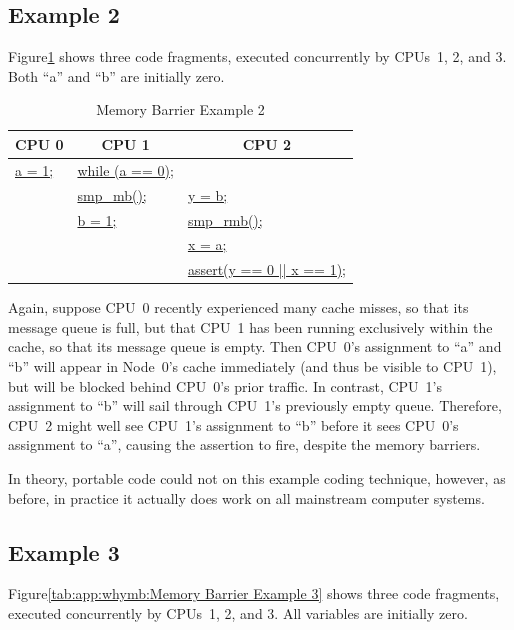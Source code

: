 \subsection{Example 2}
\label{sec:app:whymb:Example 2}

Figure\ref{tab:app:whymb:Memory Barrier Example 2}
shows three code fragments, executed concurrently by CPUs~1, 2, and 3.
Both ``a'' and ``b'' are initially zero.

\begin{table}
\small
\begin{center}
\begin{tabular}{l|l|l}
	\multicolumn{1}{c|}{CPU 0} &
		\multicolumn{1}{c|}{CPU 1} &
			\multicolumn{1}{c}{CPU 2} \\
	\hline
	\hline
	\url{a = 1;} & \url{while (a == 0)}; & \\
		     & \url{smp_mb();}	& \url{y = b;} \\
		     & \url{b = 1;}	& \url{smp_rmb();} \\
		     &			& \url{x = a;} \\
		     &			& \url{assert(y == 0 || x == 1);} \\
\end{tabular}
\end{center}
\caption{Memory Barrier Example 2}
\label{tab:app:whymb:Memory Barrier Example 2}
\end{table}

Again, suppose CPU~0 recently experienced many cache misses, so that its
message queue is full, but that CPU~1 has been running exclusively within
the cache, so that its message queue is empty.
Then CPU~0's assignment to ``a'' and ``b'' will appear in Node~0's cache
immediately (and thus be visible to CPU~1), but will be blocked behind
CPU~0's prior traffic.
In contrast, CPU~1's assignment to ``b'' will sail through CPU~1's
previously empty queue.
Therefore, CPU~2 might well see CPU~1's assignment to ``b'' before
it sees CPU~0's assignment to ``a'', causing the assertion to fire,
despite the memory barriers.

In theory, portable code could not on this example coding technique, however,
as before, in practice it actually does work on all
mainstream computer systems.

\subsection{Example 3}
\label{sec:app:whymb:Example 3}

Figure\ref{tab:app:whymb:Memory Barrier Example 3}
shows three code fragments, executed concurrently by CPUs~1, 2, and 3.
All variables are initially zero.


